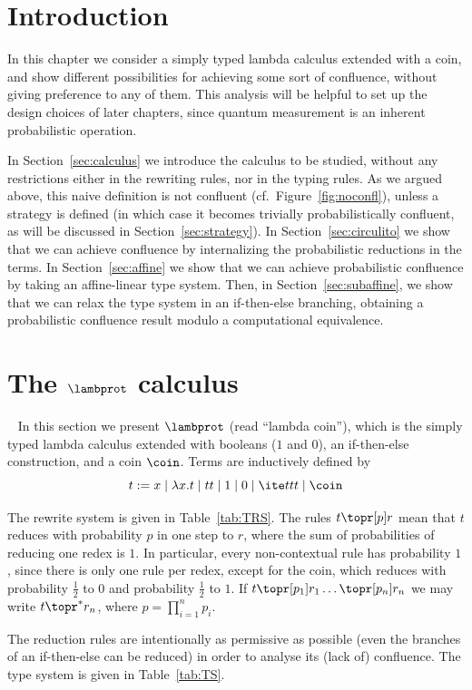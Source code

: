 \section{Introduction}
In this chapter we consider a simply typed lambda calculus extended with a coin, and show different possibilities for achieving some sort of confluence, without giving preference to any of them. This analysis will be helpful to set up the design choices of later chapters, since quantum measurement is an inherent probabilistic operation.

In Section~\ref{sec:calculus} we introduce the calculus to be studied, without any restrictions either in the rewriting rules, nor in the typing rules. As we argued above, this naive definition is not confluent (cf.~Figure~\ref{fig:noconfl}), unless a strategy is defined (in which case it becomes trivially probabilistically confluent, as will be discussed in Section~\ref{sec:strategy}).
In Section~\ref{sec:circulito} we show that we can achieve confluence by internalizing the probabilistic reductions in the terms. In Section~\ref{sec:affine} we show that we can achieve probabilistic confluence by taking an affine-linear type system. Then, in Section~\ref{sec:subaffine}, we show that we can relax the type system in an if-then-else branching, obtaining a probabilistic confluence result modulo a computational equivalence.

\section{The \texorpdfstring{$\lambprot$}{lambda coin} calculus}~\label{sec:calculus}
In this section we present 
$\lambprot$ (read ``lambda coin''), which is the
simply typed lambda calculus extended with booleans ($1$ and $0$), an if-then-else construction, and a coin $\coin$.
%
Terms are inductively defined by 
\[
  t := x\mid \lambda x.t \mid tt \mid 1\mid 0\mid \ite ttt\mid \coin
\]

The rewrite system is given in Table~\ref{tab:TRS}. The rules $t\topr[p]r$ mean that $t$ reduces with probability $p$ in one step to $r$, where the sum of probabilities of reducing one redex is $1$. In particular, every non-contextual rule has probability $1$, since there is only one rule per redex, except for the coin, which reduces with probability $\frac 12$ to $0$ and probability $\frac 12$ to $1$. If $t\topr[p_1]r_1\dots\topr[p_n]r_n$ we may write $t\topr^*r_n$, where $p=\prod_{i=1}^np_i$.

The reduction rules are intentionally as permissive as possible (even the branches of an if-then-else can be reduced) in order to analyse its (lack of) confluence. The type system is given in Table~\ref{tab:TS}.

